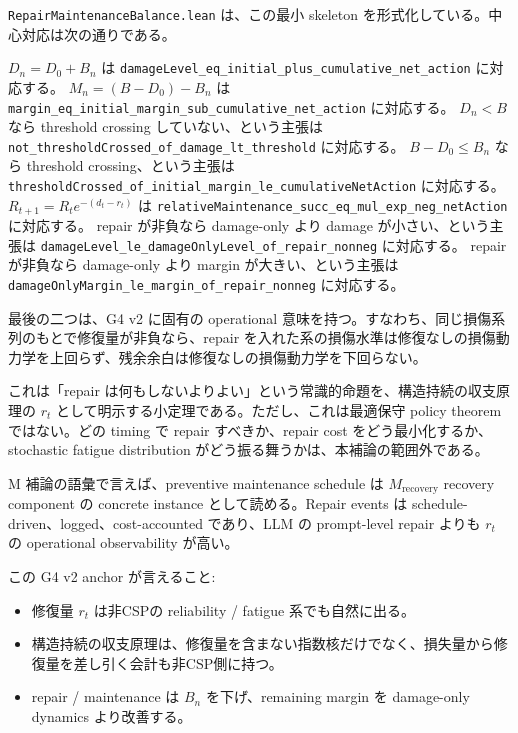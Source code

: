\documentclass[12pt,a4paper]{article}
\begin{document}
\texttt{RepairMaintenanceBalance.lean} は、この最小 skeleton を形式化している。中心対応は次の通りである。

\(D_{n}=D_0+B_{n}\) は \texttt{damageLevel\_eq\_initial\_plus\_cumulative\_net\_action} に対応する。 \(M_{n}=(B-D_0)-B_{n}\) は \texttt{margin\_eq\_initial\_margin\_sub\_cumulative\_net\_action} に対応する。 \(D_{n}<B\) なら threshold crossing していない、という主張は \texttt{not\_thresholdCrossed\_of\_damage\_lt\_threshold} に対応する。 \(B-D_0\le B_{n}\) なら threshold crossing、という主張は \texttt{thresholdCrossed\_of\_initial\_margin\_le\_cumulativeNetAction} に対応する。 \(R_{t+1}=R_{t} e^{-(d_{t}-r_{t})}\) は \texttt{relativeMaintenance\_succ\_eq\_mul\_exp\_neg\_netAction} に対応する。 repair が非負なら damage-only より damage が小さい、という主張は \texttt{damageLevel\_le\_damageOnlyLevel\_of\_repair\_nonneg} に対応する。 repair が非負なら damage-only より margin が大きい、という主張は \texttt{damageOnlyMargin\_le\_margin\_of\_repair\_nonneg} に対応する。

最後の二つは、G4 v2 に固有の operational 意味を持つ。すなわち、同じ損傷系列のもとで修復量が非負なら、repair を入れた系の損傷水準は修復なしの損傷動力学を上回らず、残余余白は修復なしの損傷動力学を下回らない。

これは「repair は何もしないよりよい」という常識的命題を、構造持続の収支原理の \(r_{t}\) として明示する小定理である。ただし、これは最適保守 policy theorem ではない。どの timing で repair すべきか、repair cost をどう最小化するか、stochastic fatigue distribution がどう振る舞うかは、本補論の範囲外である。

M 補論の語彙で言えば、preventive maintenance schedule は \(M_{\mathrm{recovery}}\) recovery component の concrete instance として読める。Repair events は schedule-driven、logged、cost-accounted であり、LLM の prompt-level repair よりも \(r_{t}\) の operational observability が高い。

この G4 v2 anchor が言えること:

\begin{itemize}
\tightlist
\item
  修復量 \(r_{t}\) は非CSPの reliability / fatigue 系でも自然に出る。
\item
  構造持続の収支原理は、修復量を含まない指数核だけでなく、損失量から修復量を差し引く会計も非CSP側に持つ。
\item
  repair / maintenance は \(B_{n}\) を下げ、remaining margin を damage-only dynamics より改善する。
\end{itemize}
\end{document}
